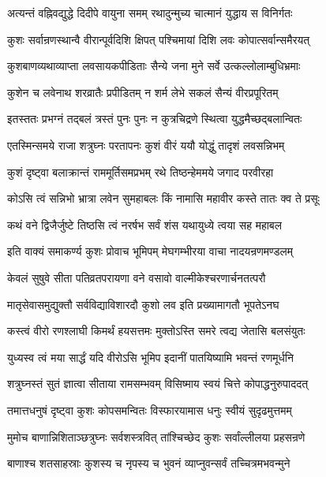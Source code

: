 \twolineshloka
{अत्यन्तं वह्निवद्युद्धे दिदीपे वायुना समम्}
{रथादुन्मुच्य चात्मानं युद्धाय स विनिर्गतः}%

\twolineshloka
{कुशः सर्वान्रणस्थान्वै वीरान्पूर्वदिशि क्षिपत्}
{पश्चिमायां दिशि लवः कोपात्सर्वान्समैरयत्}%

\twolineshloka
{कुशबाणव्यथाव्याप्ता लवसायकपीडिताः}
{सैन्ये जना मुने सर्वे उत्कल्लोलाम्बुधिभ्रमाः}%

\twolineshloka
{कुशेन च लवेनाथ शरव्रातैः प्रपीडितम्}
{न शर्म लेभे सकलं सैन्यं वीरप्रपूरितम्}%

\twolineshloka
{इतस्ततः प्रभग्नं तद्बलं त्रस्तं पुनः पुनः}
{न कुत्रचिद्रणे स्थित्वा युद्धमैच्छद्बलान्वितः}%

\twolineshloka
{एतस्मिन्समये राजा शत्रुघ्नः परतापनः}
{कुशं वीरं ययौ योद्धुं तादृशं लवसन्निभम्}%

\twolineshloka
{कुशं दृष्ट्वा बलाक्रान्तं राममूर्तिसमप्रभम्}
{रथे तिष्ठन्हेममये जगाद परवीरहा}%


\twolineshloka
{कोऽसि त्वं सन्निभो भ्रात्रा लवेन सुमहाबलः}
{किं नामासि महावीर कस्ते तातः क्व ते प्रसूः}%

\twolineshloka
{कथं वने द्विजैर्जुष्टे तिष्ठसि त्वं नरर्षभ}
{सर्वं शंस यथायुध्ये त्वया सह महाबल}%

\twolineshloka
{इति वाक्यं समाकर्ण्य कुशः प्रोवाच भूमिपम्}
{मेघगम्भीरया वाचा नादयन्रणमण्डलम्}%

\twolineshloka
{केवलं सुषुवे सीता पतिव्रतपरायणा}
{वने वसावो वाल्मीकेश्चरणार्चनतत्परौ}%

\twolineshloka
{मातृसेवासमुद्युक्तौ सर्वविद्याविशारदौ}
{कुशो लव इति प्रख्यामागतौ भूपतेऽनघ}%

\twolineshloka
{कस्त्वं वीरो रणश्लाघी किमर्थं हयसत्तमः}
{मुक्तोऽस्ति समरे त्वद्य जेतासि बलसंयुतः}%

\twolineshloka
{युध्यस्व त्वं मया सार्द्धं यदि वीरोऽसि भूमिप}
{इदानीं पातयिष्यामि भवन्तं रणमूर्धनि}%

\twolineshloka
{शत्रुघ्नस्तं सुतं ज्ञात्वा सीताया रामसम्भवम्}
{विसिष्माय स्वयं चित्ते कोपाद्धनुरुपाददत्}%

\twolineshloka
{तमात्तधनुषं दृष्ट्वा कुशः कोपसमन्वितः}
{विस्फारयामास धनुः स्वीयं सुदृढमुत्तमम्}%

\twolineshloka
{मुमोच बाणान्निशिताञ्छत्रुघ्नः सर्वशस्त्रवित्}
{तांश्चिच्छेद कुशः सर्वांल्लीलया प्रहसन्रणे}%

\twolineshloka
{बाणाश्च शतसाहस्राः कुशस्य च नृपस्य च}
{भुवनं व्याप्नुवन्सर्वं तच्चित्रमभवन्मुने}%

